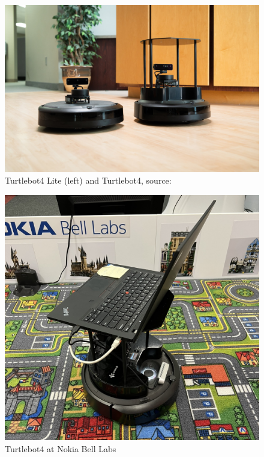 \begin{figure}[htbp]
    \centering
    \includegraphics[width=150mm, keepaspectratio]{figures/TurtleBot4.jpg}
    \caption{Turtlebot4 Lite (left) and Turtlebot4, source:\cite{Turtlebot4Pic}}
    \label{fig:turtlebot4}
\end{figure}

\begin{figure}[htbp]
    \centering
    \includegraphics[width=150mm, keepaspectratio]{figures/turtlebot4_nokia.JPEG}
    \caption{Turtlebot4 at Nokia Bell Labs}
    \label{fig:turtlebot4_nokia}
\end{figure}




